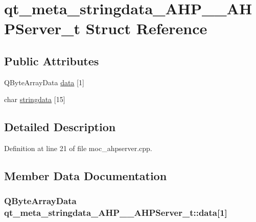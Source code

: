 \hypertarget{structqt__meta__stringdata___a_h_p_____a_h_p_server__t}{}\section{qt\+\_\+meta\+\_\+stringdata\+\_\+\+A\+H\+P\+\_\+\+\_\+\+A\+H\+P\+Server\+\_\+t Struct Reference}
\label{structqt__meta__stringdata___a_h_p_____a_h_p_server__t}
\subsection*{Public Attributes}
\begin{DoxyCompactItemize}
\item 
Q\+Byte\+Array\+Data \hyperlink{structqt__meta__stringdata___a_h_p_____a_h_p_server__t_a59d04d648cc0b996af1e92af036bc647}{data} \mbox{[}1\mbox{]}
\item 
char \hyperlink{structqt__meta__stringdata___a_h_p_____a_h_p_server__t_adc32c7e543926d74e2f151901602afc7}{stringdata} \mbox{[}15\mbox{]}
\end{DoxyCompactItemize}


\subsection{Detailed Description}


Definition at line 21 of file moc\+\_\+ahpserver.\+cpp.



\subsection{Member Data Documentation}
\hypertarget{structqt__meta__stringdata___a_h_p_____a_h_p_server__t_a59d04d648cc0b996af1e92af036bc647}{}
\subsubsection[{data}]{\setlength{\rightskip}{0pt plus 5cm}Q\+Byte\+Array\+Data qt\+\_\+meta\+\_\+stringdata\+\_\+\+A\+H\+P\+\_\+\+\_\+\+A\+H\+P\+Server\+\_\+t\+::data\mbox{[}1\mbox{]}}\label{structqt__meta__stringdata___a_h_p_____a_h_p_server__t_a59d04d648cc0b996af1e92af036bc647}


